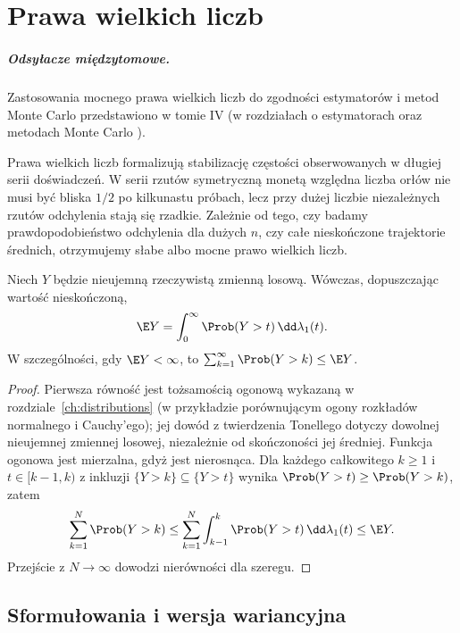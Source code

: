 \chapter{Prawa wielkich liczb}
\label{ch:lln}

\providecommand{\atlasref}[2]{#2}

\paragraph{Odsyłacze międzytomowe.}
Zastosowania mocnego prawa wielkich liczb do zgodności
estymatorów i metod Monte Carlo przedstawiono w tomie IV
(w rozdziałach o estymatorach oraz metodach Monte Carlo%
).


Prawa wielkich liczb formalizują stabilizację częstości
obserwowanych w długiej serii doświadczeń. W serii rzutów symetryczną monetą
względna liczba orłów nie musi być bliska $1/2$ po
kilkunastu próbach, lecz przy dużej liczbie niezależnych
rzutów odchylenia stają się rzadkie. Zależnie od tego,
czy badamy prawdopodobieństwo odchylenia dla dużych $n$,
czy całe nieskończone trajektorie średnich, otrzymujemy
słabe albo mocne prawo wielkich liczb.

\begin{lemat}
Niech $Y$ będzie nieujemną rzeczywistą zmienną losową.
Wówczas, dopuszczając wartość nieskończoną,
\[
\E Y=\int_0^\infty \Prob(Y>t)\,\dd\lambda_1(t).
\]
W szczególności, gdy $\E Y<\infty$, to
$\sum_{k=1}^\infty\Prob(Y>k)\leq\E Y$.
\end{lemat}
\begin{proof}
Pierwsza równość jest tożsamością ogonową
wykazaną w rozdziale~\ref{ch:distributions}
(w przykładzie porównującym ogony rozkładów
normalnego i Cauchy'ego); jej dowód z twierdzenia
Tonellego dotyczy dowolnej nieujemnej zmiennej
losowej, niezależnie od skończoności jej średniej.
Funkcja ogonowa jest mierzalna, gdyż jest nierosnąca.
Dla każdego całkowitego $k\geq1$ i $t\in[k-1,k)$
z inkluzji $\{Y>k\}\subseteq\{Y>t\}$ wynika
$\Prob(Y>t)\geq\Prob(Y>k)$, zatem
\[
\sum_{k=1}^N\Prob(Y>k)
\leq\sum_{k=1}^N\int_{k-1}^k\Prob(Y>t)\,\dd\lambda_1(t)
\leq\E Y.
\]
Przejście z $N\to\infty$ dowodzi nierówności
dla szeregu.
\end{proof}

\section{Sformułowania i wersja wariancyjna}

